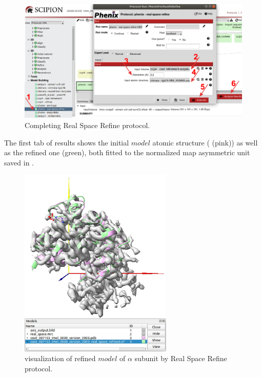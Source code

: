  \begin{figure}[H]
  \centering 
  \captionsetup{width=.9\linewidth} 
  \includegraphics[width=1\textwidth]{Images/Fig29}
  \caption{Completing \phenix Real Space Refine protocol.}
  \label{fig:phenix_real_space_refine_protocol}
  \end{figure}
 
 The first tab of results shows the initial $model$ atomic structure  ( (pink)) as well as the refined one (green), both fitted to the normalized map asymmetric unit saved in \coot. 
 
 \begin{figure}[H]
  \centering 
  \captionsetup{width=.9\linewidth} 
  \includegraphics[width=0.65\textwidth]{Images/Fig30}
  \caption{\chimera visualization of refined $model$ of  $\alpha$ subunit by \phenix Real Space Refine protocol.}
  \label{fig:phenix_real_space_refine_chimera}
  \end{figure}
  
